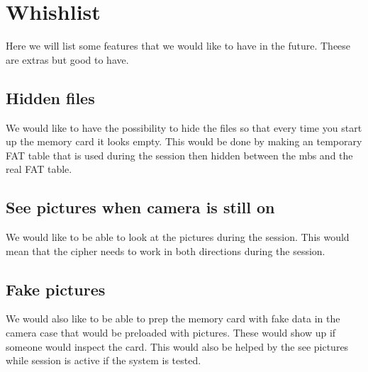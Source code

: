\documentclass[]{article}
\begin{document}
\begin{table}[h]
	\centering
	\caption{This table shows the CID list}
	\label{table:cidList}
\end{table}

\clearpage

\section{Whishlist}
Here we will list some features that we would like to have in the future.
Theese are extras but good to have.

\subsection{Hidden files}
We would like to have the possibility to hide the files so that every time you start up the memory card it looks empty.
This would be done by making an temporary FAT table that is used during the session then hidden between the \gls{mbs} and the real FAT table.

\subsection{See pictures when camera is still on}
We would like to be able to look at the pictures during the session.
This would mean that the cipher needs to work in both directions during the session.

\subsection{Fake pictures}
We would also like to be able to prep the memory card with fake data in the camera case that would be preloaded with pictures.
These would show up if someone would inspect the card.
This would also be helped by the see pictures while session is active if the system is tested.




\clearpage
\newpage
\printglossary[type=\acronymtype]
\printnoidxglossaries


{}

\end{document}
